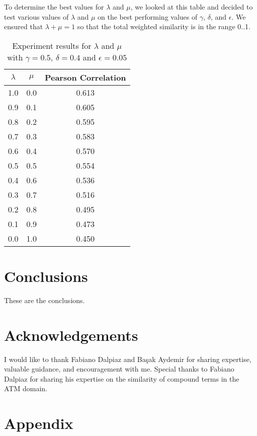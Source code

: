 \documentclass{article}
\begin{document}
To determine the best values for $\lambda$ and $\mu$, we looked at this table and decided to test various values of $\lambda$ and $\mu$ on the best performing values of $\gamma$, $\delta$, and $\epsilon$. We ensured that $\lambda + \mu = 1$ so that the total weighted similarity is in the range 0..1.

\begin{table}[h!]
\centering
\begin{tabular}{|c|c||c|}
	\hline
	$\lambda$ & $\mu$ & Pearson Correlation \\
	\hline
	1.0 & 0.0 & 0.613 \\
	0.9 & 0.1 & 0.605 \\
	0.8 & 0.2 & 0.595 \\
	0.7 & 0.3 & 0.583 \\
	0.6 & 0.4 & 0.570 \\
	0.5 & 0.5 & 0.554 \\
	0.4 & 0.6 & 0.536 \\
	0.3 & 0.7 & 0.516 \\
	0.2 & 0.8 & 0.495 \\
	0.1 & 0.9 & 0.473 \\
	0.0 & 1.0 & 0.450 \\
	\hline
\end{tabular}
\caption{Experiment results for $\lambda$ and $\mu$ with $\gamma = 0.5$, $\delta = 0.4$ and $\epsilon = 0.05$}
\label{table:lambdamuresults}
\end{table}

\section{Conclusions} \label{sec:conclusions}

These are the conclusions.

\section{Acknowledgements} \label{sec:ack}

I would like to thank Fabiano Dalpiaz and Ba\c sak Aydemir for sharing expertise, valuable guidance, and encouragement with me. Special thanks to Fabiano Dalpiaz for sharing his expertise on the similarity of compound terms in the ATM domain.

\printbibliography

\section{Appendix}
\end{document}
